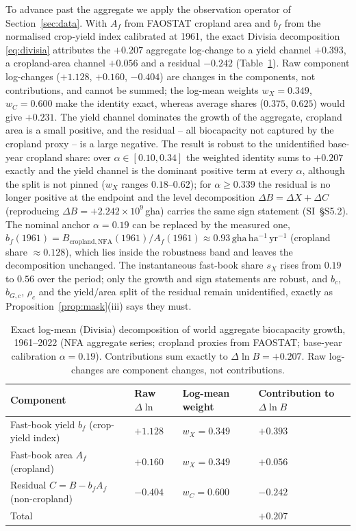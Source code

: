To advance past the aggregate we apply the observation operator of Section~\ref{sec:data}. With $A_f$ from FAOSTAT cropland area and $b_f$ from the normalised crop-yield index calibrated at 1961, the exact Divisia decomposition \eqref{eq:divisia} attributes the $+0.207$ aggregate log-change to a yield channel $+0.393$, a cropland-area channel $+0.056$ and a residual $-0.242$ (Table~\ref{tab:divisia}). Raw component log-changes ($+1.128$, $+0.160$, $-0.404$) are changes in the components, not contributions, and cannot be summed; the log-mean weights $w_X=0.349$, $w_C=0.600$ make the identity exact, whereas average shares ($0.375$, $0.625$) would give $+0.231$. The yield channel dominates the growth of the aggregate, cropland area is a small positive, and the residual -- all biocapacity not captured by the cropland proxy -- is a large negative. The result is robust to the unidentified base-year cropland share: over $\alpha\in[0.10,0.34]$ the weighted identity sums to $+0.207$ exactly and the yield channel is the dominant positive term at every $\alpha$, although the split is not pinned ($w_X$ ranges $0.18$--$0.62$); for $\alpha\ge0.339$ the residual is no longer positive at the endpoint and the level decomposition $\Delta B=\Delta X+\Delta C$ (reproducing $\Delta B=+2.242\times10^{9}$\,gha) carries the same sign statement (SI~\S S5.2). The nominal anchor $\alpha=0.19$ can be replaced by the measured one, $b_f(1961)=B_{\mathrm{cropland,NFA}}(1961)/A_f(1961)\approx0.93\,\mathrm{gha\,ha^{-1}\,yr^{-1}}$ (cropland share $\approx0.128$), which lies inside the robustness band and leaves the decomposition unchanged. The instantaneous fast-book share $s_X$ rises from $0.19$ to $0.56$ over the period; only the growth and sign statements are robust, and $b_c$, $b_{G,c}$, $\rho_c$ and the yield/area split of the residual remain unidentified, exactly as Proposition~\ref{prop:mask}(iii) says they must.

\begin{table}[!htbp]
\centering\small
\caption{Exact log-mean (Divisia) decomposition of world aggregate biocapacity growth, 1961--2022 (NFA aggregate series; cropland proxies from FAOSTAT; base-year calibration $\alpha=0.19$). Contributions sum exactly to $\Delta\ln B=+0.207$. Raw log-changes are component changes, not contributions.}
\label{tab:divisia}
\begin{tabularx}{\textwidth}{X l l l}
\toprule
Component & Raw $\Delta\ln$ & Log-mean weight & Contribution to $\Delta\ln B$ \\
\midrule
Fast-book yield $b_f$ (crop-yield index) & $+1.128$ & $w_X=0.349$ & $+0.393$ \\
Fast-book area $A_f$ (cropland) & $+0.160$ & $w_X=0.349$ & $+0.056$ \\
Residual $C=B-b_fA_f$ (non-cropland) & $-0.404$ & $w_C=0.600$ & $-0.242$ \\
\midrule
Total & & & $+0.207$ \\
\bottomrule
\end{tabularx}
\end{table}

